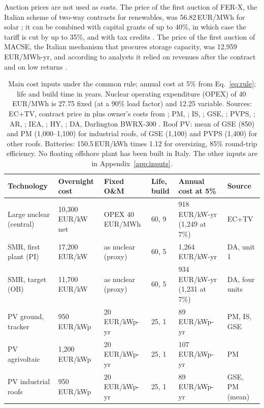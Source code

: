 Auction prices are not used as costs. The price of the first auction of FER-X, the Italian scheme of two-way contracts for renewables, was 56.82\,EUR/MWh for solar \citep{FERXmain2025}; it can be combined with capital grants of up to 40\%, in which case the tariff is cut by up to 35\%, and with tax credits \citep{AndersenFERX}. The price of the first auction of MACSE, the Italian mechanism that procures storage capacity, was 12{,}959\,EUR/MWh-yr, and according to analysts it relied on revenues after the contract and on low returns \citep{ModoMACSE}.

\begin{table}[!tb]
\centering\footnotesize
\caption{Main cost inputs under the common rule; annual cost at 5\% from Eq.~\eqref{eq:rule}; life and build time in years. Nuclear operating expenditure (OPEX) of 40\,EUR/MWh is 27.75 fixed (at a 90\% load factor) and 12.25 variable. Sources: EC+TV, contract price in \citet{ECDukovany2026} plus owner's costs from \citet{CT24Dukovany}; PM, \citet{PoliMiRER2025}; IS, \citet{ItaliaSolare2025}; GSE, \citet{GSELCOE2025}; PVPS, \citet{IEAPVPS2024}; AR, \citet{ARERA332}; IEA, \citet{IEAGHR2025}; HY, \citet{HystoriesD86}; DA, Darlington BWRX-300 \citep{POWERDarlington2025}. Roof PV: mean of GSE (850) and PM (1{,}000--1{,}100) for industrial roofs, of GSE (1{,}100) and PVPS (1{,}400) for other roofs. Batteries: 150.5\,EUR/kWh times 1.12 for oversizing, 85\% round-trip efficiency. No floating offshore plant has been built in Italy. The other inputs are in Appendix~\ref{app:inputs}.}\label{tab:inputs}
\begin{tabularx}{\linewidth}{@{}P{3.15cm}P{2.95cm}P{2.55cm}P{0.8cm}P{3.0cm}L@{}}
\toprule
Technology & Overnight cost & Fixed O\&M & Life, build & Annual cost at 5\% & Source\\
\midrule
Large nuclear (central) & 10{,}300\,EUR/kW net & OPEX 40\,EUR/MWh & 60, 9 & 918\,EUR/kW-yr (1{,}249 at 7\%) & EC+TV\\
SMR, first plant (PI) & 17{,}200\,EUR/kW & as nuclear (proxy) & 60, 5 & 1{,}264\,EUR/kW-yr & DA, unit 1\\
SMR, target (OB) & 11{,}700\,EUR/kW & as nuclear (proxy) & 60, 5 & 934\,EUR/kW-yr (1{,}231 at 7\%) & DA, four units\\
PV ground, tracker & 950\,EUR/kWp & 20\,EUR/kWp-yr & 25, 1 & 89\,EUR/kWp-yr & PM, IS, GSE\\
PV agrivoltaic & 1{,}200\,EUR/kWp & 20\,EUR/kWp-yr & 25, 1 & 107\,EUR/kWp-yr & PM\\
PV industrial roofs & 950\,EUR/kWp & 20\,EUR/kWp-yr & 25, 1 & 89\,EUR/kWp-yr & GSE, PM (mean)\\

\end{tabularx}
\end{table}
